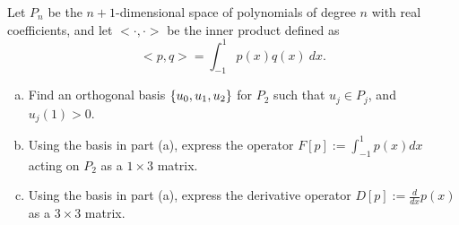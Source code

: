\begin{problem}
	Let $ P_n $ be the $ n+1 $-dimensional space of polynomials of degree $ n $ with real coefficients, and let $ <\cdot,\cdot> $ be the inner product defined as
	\[ <p,q> = \int_{-1}^{1} p(x)q(x)\ dx. \]
	\begin{enumerate}[(a)]
		\item Find an orthogonal basis $ \{u_0, u_1, u_2\} $ for $ P_2 $ such that $ u_j \in P_j $, and $ u_j(1) > 0 $.
		\item Using the basis in part (a), express the operator $ F[p] := \int_{-1}^{1} p(x) dx $ acting on $ P_2 $ as a $ 1\times 3 $ matrix. 
		\item Using the basis in part (a), express the derivative operator $ D[p]:= \frac{d}{dx}p(x) $ as a $ 3\times 3 $ matrix. 
	\end{enumerate}
\end{problem}
